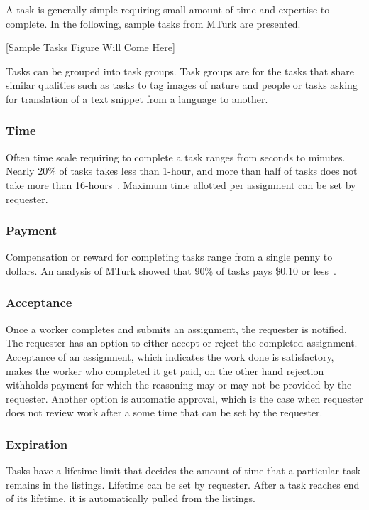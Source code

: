 A task is generally simple requiring small amount of time and expertise to complete. 
In the following, sample tasks from MTurk are presented.

[Sample Tasks Figure Will Come Here]

Tasks can be grouped into task groups. Task groups are for the tasks that share 
similar qualities such as tasks to tag images of nature and people or tasks asking
for translation of a text snippet from a language to another.

\subsubsection{Time}
Often time scale requiring to complete a task ranges from seconds to minutes. 
Nearly 20\% of tasks takes less than 1-hour, and more than half of tasks does not 
take more than 16-hours~\cite{Ipeirotis2010}. Maximum time allotted per 
assignment can be set by requester. 

\subsubsection{Payment}
Compensation or reward for completing tasks range from a single penny to dollars. 
An analysis of MTurk showed that 90\% of tasks pays \$0.10 or less~\cite{Ipeirotis2010}.

\subsubsection{Acceptance}
Once a worker completes and submits an assignment, the requester is notified. 
The requester has an option to either accept or reject the completed assignment. 
Acceptance of an assignment, which indicates the work done is satisfactory, 
makes the worker who completed it get paid, on the other hand rejection withholds 
payment for which the reasoning may or may not be provided by the requester. 
Another option is automatic approval, which is the case when requester does not 
review work after a some time that can be set by the requester.

\subsubsection{Expiration}
Tasks have a lifetime limit that decides the amount of time that a particular task 
remains in the listings. Lifetime can be set by requester. After a task reaches 
end of its lifetime, it is automatically pulled from the listings.

